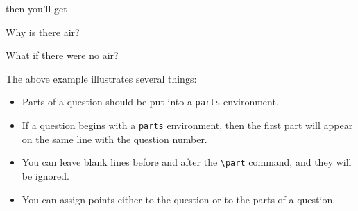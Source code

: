 \documentclass[12pt]{exam}
\makeatletter
\newcommand{\indt}[1]{\index{#1@\texttt{#1}}}
\makeatother
\begin{document}
then you'll get
\begin{questions}
\question[10]
Why is there air?

\question
What if there were no air?


\question[20]



\end{questions}

\bigskip

The above example illustrates several things:
\begin{itemize}
\item Parts of a question should be put into a
  \verb"parts"\indt{parts}%
   environment.
\item If a question begins with a \verb"parts" environment, then the
  first part will appear on the same line with the question number.
\item You can leave blank
  lines before and after the \verb"\part" command,
  and they will be ignored.
\item You can assign points either to the question or to the parts of
  a question.
\end{itemize}
\end{document}
